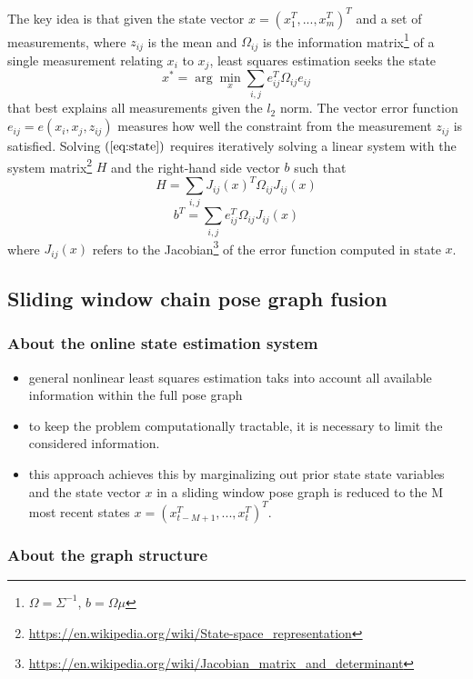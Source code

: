 \documentclass[letterpaper,10pt]{article}
\begin{document}
The key idea is that given the state vector $x=(x_1^T, ..., x_m^T)^T$ and a set of measurements, where $z_{ij}$ is the mean and $\Omega_{ij}$ is the information matrix\footnote{$\Omega=\Sigma^{-1}$, $b=\Omega \mu$} of a single measurement relating $x_i$ to $x_j$, least squares estimation seeks the state
\begin{equation}
x^*=\arg\min_x{\sum_{i,j}e_{ij}^T\Omega_{ij}e_{ij}}
\label{eq:state}
\end{equation}
that best explains all measurements given the $\mathit{l}_2$ norm. The vector error function $e_{ij}=e(x_i,x_j,z_{ij})$ measures how well the constraint from the measurement $z_{ij}$ is satisfied. Solving $(\ref{eq:state})$ requires iteratively solving a linear system with the system matrix\footnote{\url{https://en.wikipedia.org/wiki/State-space_representation}} $H$ and the right-hand side vector $b$ such that
$$H=\sum_{i,j}{J_{ij}(x)^T\Omega_{ij}J_{ij}(x)}$$
$$b^T=\sum_{i,j}e_{ij}^T\Omega_{ij}J_{ij}(x)$$
where $J_{ij}(x)$ refers to the Jacobian\footnote{\url{https://en.wikipedia.org/wiki/Jacobian_matrix_and_determinant}} of the error function computed in state $x$.

\subsection{Sliding window chain pose graph fusion}

\subsubsection{About the online state estimation system}

\begin{itemize}
	\item general nonlinear least squares estimation taks into account all available information within the full pose graph
	\item to keep the problem computationally tractable, it is necessary to limit the considered information.
	\item this approach achieves this by marginalizing out prior state state variables and the state vector $x$ in a sliding window pose graph is reduced to the M most recent states $x=(x_{t-M+1}^T,...,x_t^T)^T$.
\end{itemize}

\subsubsection{About the graph structure}
\end{document}
